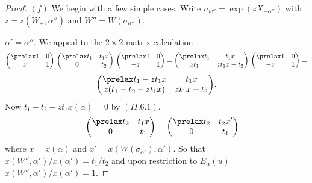 \documentclass{memo-l}
\theoremstyle{definition}
\theoremstyle{remark}
\numberwithin{section}{chapter}
\numberwithin{equation}{chapter}
\begin{document}
\begin{proof}
   $(f)$ We begin with a few simple cases.  Write $n_{w''}  = 
\exp(zX_{-{\alpha}''})$ with $z = z(W_{+},{\alpha''})$ and $W''  = 
W({\sigma}_{{\alpha''}})$.
 

 ${\alpha}' = {\alpha''}$.  We appeal to the $2\times 2$ matrix
calculation
$$
{\begin{pmatrix} \prelax  1 & 0 \\ z & 1 \end{pmatrix}}\
{\begin{pmatrix} \prelax  
 t_1 & t_1x \\ 0 & t_2 \end{pmatrix}}\
{\begin{pmatrix} \prelax  
 1 & 0 \\ -z & 1 \end{pmatrix}}
=
{\begin{pmatrix} \prelax  
 t_1 & t_1x \\ zt_1 & zt_1x+t_2 \end{pmatrix}}\
{\begin{pmatrix} \prelax  
 1 & 0 \\ -z & 1 \end{pmatrix}} =
$$
$$
{\begin{pmatrix} \prelax  
 t_1-zt_1x & t_1x \\
z(t_1-t_2-zt_1x) & zt_1x+t_2 \end{pmatrix}} .
$$
Now $t_{1}-t_{2}-zt_{1}x({\alpha})  =  0$ by $(II.6.1)$.
$$
=\ {\begin{pmatrix} \prelax  
t_2 & t_1x \\ 0 & t_1 \end{pmatrix}} = 
{\begin{pmatrix} \prelax  
t_2 & t_2x' \\ 0 & t_1 \end{pmatrix}}
$$
where $x = x({\alpha})$ and $x'  = 
x(W({\sigma}_{{\alpha}'}),{\alpha}')$.  So that
$x(W'',{\alpha}')/x({\alpha}')  =  t_{1}/t_{2}$ and upon restriction to
$E_{{\alpha}}(u)$ $x(W'',{\alpha}')/x({\alpha}')  =  1$.
\enddefinition



\end{proof}
\end{document}
